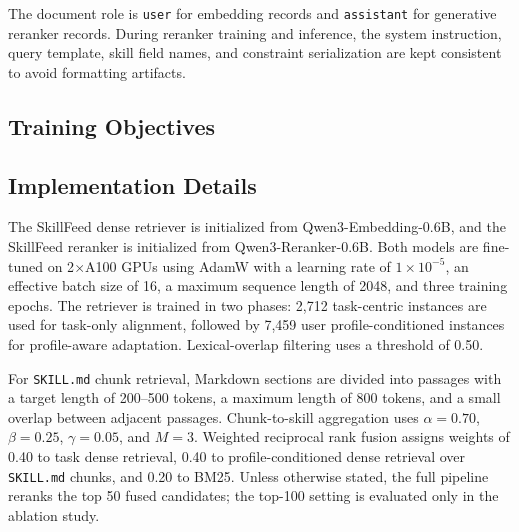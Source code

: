 \documentclass[letterpaper]{article} %
\begin{document}
The document role is \texttt{user} for embedding records and
\texttt{assistant} for generative reranker records. During reranker
training and inference, the system instruction, query template, skill field
names, and constraint serialization are kept consistent to avoid formatting
artifacts.


\subsection{Training Objectives}
\label{app:training_objectives}



\subsection{Implementation Details}
\label{app:implementation_details}

The SkillFeed dense retriever is initialized from
Qwen3-Embedding-0.6B, and the SkillFeed reranker is initialized from
Qwen3-Reranker-0.6B. Both models are fine-tuned on 2$\times$A100 GPUs using
AdamW with a learning rate of $1\times10^{-5}$, an effective batch size of 16,
a maximum sequence length of 2048, and three training epochs. The retriever is
trained in two phases: 2,712 task-centric instances are used for task-only
alignment, followed by 7,459 user profile-conditioned instances for
profile-aware adaptation. Lexical-overlap filtering uses a threshold of 0.50.

For \texttt{SKILL.md} chunk retrieval, Markdown sections are divided into
passages with a target length of 200--500 tokens, a maximum length of 800
tokens, and a small overlap between adjacent passages. Chunk-to-skill
aggregation uses $\alpha=0.70$, $\beta=0.25$, $\gamma=0.05$, and $M=3$.
Weighted reciprocal rank fusion assigns weights of 0.40 to task dense
retrieval, 0.40 to profile-conditioned dense retrieval over
\texttt{SKILL.md} chunks, and 0.20 to BM25. Unless otherwise stated, the full
pipeline reranks the top 50 fused candidates; the top-100 setting is evaluated
only in the ablation study.
\end{document}
